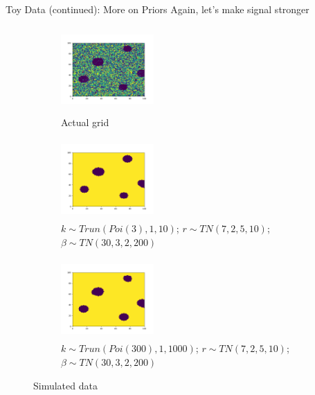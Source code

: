 \documentclass[10pt,mathserif]{beamer}
\begin{document}
\begin{frame}{Toy Data (continued): More on Priors}
Again, let's make signal stronger
\begin{figure}[t!]
    \centering
    \begin{subfigure}[t]{0.3\textwidth}
        \centering
        \includegraphics[height=1.3in, width=1.4in]{../sim_toydata2D_mu8/BDC_gridactual}
        \caption{Actual grid}
    \end{subfigure}%
    \begin{subfigure}[t]{0.3\textwidth}
        \centering
        \includegraphics[height=1.2in, width=1.4in]{../sim_toydata2D_mu8/BDC_grid7_c3_ss}
        \caption{ $k \sim Trun(Poi(3), 1, 10)$; $r \sim TN(7, 2, 5, 10)$; $\beta \sim TN(30, 3, 2, 200)$}
    \end{subfigure}%
        \begin{subfigure}[t]{0.3\textwidth}
        \centering
        \includegraphics[height=1.2in, width=1.4in]{../sim_toydata2D_mu8/BDC_grid8_c300_ss}
        \caption{ $k \sim Trun(Poi(300), 1, 1000)$; $r \sim TN(7, 2, 5, 10)$; $\beta \sim TN(30, 3, 2, 200)$}
    \end{subfigure}
    \caption{Simulated data}
\end{figure}
\end{frame}
\end{document}
